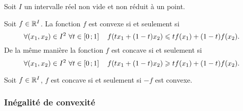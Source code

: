 Soit $I$ un intervalle réel non vide et non réduit à un point.

\begin{defdef}
  Soit $f \in \mathbb{R}^I$. La fonction $f$ est convexe si et seulement si
  \begin{equation}
    \forall (x_1, x_2) \in I^2 \ \forall t \in \left[ 0 \, ;  1 \right] \quad f(tx_1+(1-t)x_2) \leqslant tf(x_1)+(1-t)f(x_2).
  \end{equation}
  De la même manière la fonction $f$ est concave si et seulement si 
  \begin{equation}
    \forall (x_1, x_2) \in I^2 \ \forall t \in \left[ 0 \, ;  1 \right] \quad f(tx_1+(1-t)x_2) \geqslant tf(x_1)+(1-t)f(x_2).
  \end{equation}
\end{defdef}
\begin{prop}
  Soit $f \in \mathbb{R}^I$, $f$ est concave si et seulement si $-f$ est convexe.
\end{prop}

\subsubsection{Inégalité de convexité}

